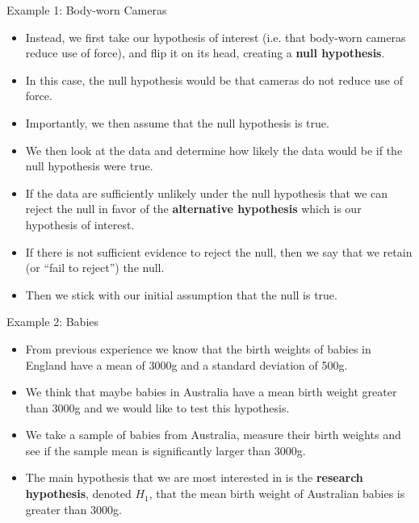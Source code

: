 \documentclass[handout]{beamer}
\begin{document}
\begin{frame}{Example 1: Body-worn Cameras}
\scriptsize{
\begin{itemize}
\item Instead, we first take our hypothesis of interest (i.e. that body-worn cameras reduce use of force), and flip it on its head, creating a \textbf{null hypothesis}.
\item In this case, the null hypothesis would be that cameras do not reduce use of force. 
\item Importantly, we then assume that the null hypothesis is true. 
\item We then look at the data and determine how likely the data would be if the null hypothesis were true. 
\item If the data are sufficiently unlikely under the null hypothesis that we can reject the null in favor of the \textbf{alternative hypothesis} which is our hypothesis of interest. 
\item If there is not sufficient evidence to reject the null, then we say that we retain (or ``fail to reject'') the null.

\item Then we stick with our initial assumption that the null is true.
 
\end{itemize}


} 
\end{frame}



\begin{frame}{Example 2: Babies}
\scriptsize{
\begin{itemize}
  \item From previous experience we know that the birth weights of babies in England have a mean of 3000g and a standard deviation of 500g.
 \item We think that maybe babies in Australia have a mean birth weight greater than 3000g and we would like to test this hypothesis.
  \item We take a sample of babies from Australia, measure their birth weights and see if the sample mean is significantly larger than 3000g. 
    \item The main hypothesis that we are most interested in is the \textbf{research hypothesis}, denoted $H_1$, that the mean birth weight of Australian babies is greater than 3000g.
\end{itemize}


} 
\end{frame}
\end{document}
